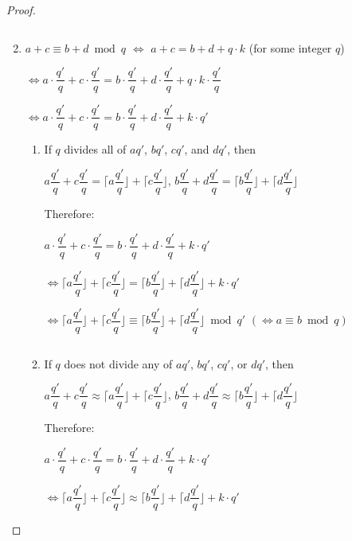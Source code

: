 \begin{proof}
\begin{enumerate}
$ $

\item $a + c\equiv b + d\bmod q$ $\Longleftrightarrow$ $a + c = b + d + q\cdot k$ (for some integer $q$)

$\Longleftrightarrow a \cdot \dfrac{q'}{q} + c \cdot \dfrac{q'}{q} = b \cdot \dfrac{q'}{q} + d \cdot \dfrac{q'}{q}  + q\cdot k \cdot \dfrac{q'}{q}$

$\Longleftrightarrow a \cdot \dfrac{q'}{q} + c \cdot \dfrac{q'}{q}  = b \cdot \dfrac{q'}{q} + d \cdot \dfrac{q'}{q} + k\cdot q'$

\begin{enumerate}

\item If $q$ divides all of $aq'$, $bq'$, $cq'$, and $dq'$, then 

$a \dfrac{q'}{q} + c  \dfrac{q'}{q}  = \Bigg\lceil a\dfrac{q'}{q}\Bigg\rfloor + \Bigg\lceil c\dfrac{q'}{q}\Bigg\rfloor$, \text{ } $b \dfrac{q'}{q} + d \dfrac{q'}{q} = \Bigg\lceil b\dfrac{q'}{q}\Bigg\rfloor + \Bigg\lceil d\dfrac{q'}{q}\Bigg\rfloor$

Therefore:

$a \cdot \dfrac{q'}{q} + c \cdot \dfrac{q'}{q} = b \cdot \dfrac{q'}{q} + d \cdot \dfrac{q'}{q} + k\cdot q'$

$\Longleftrightarrow \Bigg\lceil a\dfrac{q'}{q}\Bigg\rfloor + \Bigg\lceil c\dfrac{q'}{q}\Bigg\rfloor = \Bigg\lceil b\dfrac{q'}{q}\Bigg\rfloor + \Bigg\lceil d\dfrac{q'}{q}\Bigg\rfloor + k\cdot q'$

$\Longleftrightarrow \Bigg\lceil a\dfrac{q'}{q}\Bigg\rfloor + \Bigg\lceil c\dfrac{q'}{q}\Bigg\rfloor \equiv \Bigg\lceil b\dfrac{q'}{q}\Bigg\rfloor + \Bigg\lceil d\dfrac{q'}{q}\Bigg\rfloor \bmod q'$ \text{ } $(\Longleftrightarrow a \equiv b \bmod q)$

$ $

\item If $q$ does not divide any of $aq'$, $bq'$, $cq'$, or $dq'$, then

$a \dfrac{q'}{q} + c  \dfrac{q'}{q}  \approx \Bigg\lceil a\dfrac{q'}{q}\Bigg\rfloor + \Bigg\lceil c\dfrac{q'}{q}\Bigg\rfloor$, \text{ } $b \dfrac{q'}{q} + d \dfrac{q'}{q} \approx \Bigg\lceil b\dfrac{q'}{q}\Bigg\rfloor + \Bigg\lceil d\dfrac{q'}{q}\Bigg\rfloor$

Therefore:

$a \cdot \dfrac{q'}{q} + c \cdot \dfrac{q'}{q} = b \cdot \dfrac{q'}{q} + d \cdot \dfrac{q'}{q}  + k\cdot q'$

$\Longleftrightarrow \Bigg\lceil a\dfrac{q'}{q}\Bigg\rfloor + \Bigg\lceil c\dfrac{q'}{q}\Bigg\rfloor \approx \Bigg\lceil b\dfrac{q'}{q}\Bigg\rfloor + \Bigg\lceil d\dfrac{q'}{q}\Bigg\rfloor + k\cdot q'$


\end{enumerate}
\end{enumerate}
\end{proof}
